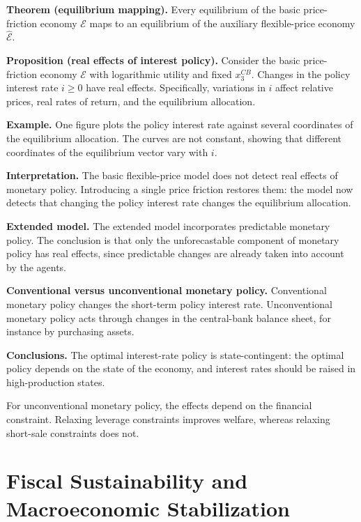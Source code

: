 \medskip\noindent
{\bf Theorem (equilibrium mapping).}
Every equilibrium of the basic
price-friction economy
$\mathcal E$ maps to an equilibrium
of the auxiliary flexible-price
economy $\widehat{\mathcal E}$.

\medskip\noindent
{\bf Proposition (real effects of
interest policy).}
Consider the basic price-friction
economy $\mathcal E$ with logarithmic
utility and fixed $x^{CB}_3$.
Changes in the policy interest rate
$i\ge0$ have real effects.
Specifically, variations in $i$
affect relative prices, real rates of
return, and the equilibrium
allocation.

\medskip\noindent
{\bf Example.}
One figure plots the policy interest
rate against several coordinates of
the equilibrium allocation. The
curves are not constant, showing that
different coordinates of the
equilibrium vector vary with $i$.

\medskip\noindent
{\bf Interpretation.}
The basic flexible-price model does
not detect real effects of monetary
policy. Introducing a single price
friction restores them: the model now
detects that changing the policy
interest rate changes the equilibrium
allocation.

\medskip\noindent
{\bf Extended model.}
The extended model incorporates
predictable monetary policy. The
conclusion is that only the
unforecastable component of monetary
policy has real effects, since
predictable changes are already taken
into account by the agents.

\medskip\noindent
{\bf Conventional versus
unconventional monetary policy.}
Conventional monetary policy changes
the short-term policy interest rate.
Unconventional monetary policy acts
through changes in the central-bank
balance sheet, for instance by
purchasing assets.

\medskip\noindent
{\bf Conclusions.}
The optimal interest-rate policy is
state-contingent: the optimal policy
depends on the state of the economy,
and interest rates should be raised
in high-production states.

For unconventional monetary policy,
the effects depend on the financial
constraint. Relaxing leverage
constraints improves welfare, whereas
relaxing short-sale constraints does
not.

\section{Fiscal Sustainability and
Macroeconomic Stabilization}
\label{section-fiscal-sustainability}

